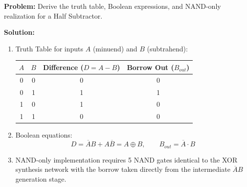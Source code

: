 \begin{examplebox}
\textbf{Problem:} Derive the truth table, Boolean expressions, and NAND-only realization for a Half Subtractor.

\textbf{Solution:}
\begin{enumerate}
    \item Truth Table for inputs $A$ (minuend) and $B$ (subtrahend):
    \begin{center}
    \begin{tabular}{c c c c}
    \toprule
    $A$ & $B$ & \textbf{Difference ($D = A - B$)} & \textbf{Borrow Out ($B_{out}$)} \\
    \midrule
    0 & 0 & 0 & 0 \\
    0 & 1 & 1 & 1 \\
    1 & 0 & 1 & 0 \\
    1 & 1 & 0 & 0 \\
    \bottomrule
    \end{tabular}
    \end{center}
    \item Boolean equations:
    \begin{equation}
    D = \overline{A}B + A\overline{B} = A \oplus B, \qquad B_{out} = \overline{A} \cdot B
    \end{equation}
    \item NAND-only implementation requires 5 NAND gates identical to the XOR synthesis network with the borrow taken directly from the intermediate $\overline{A}B$ generation stage.
\end{enumerate}
\end{examplebox}

